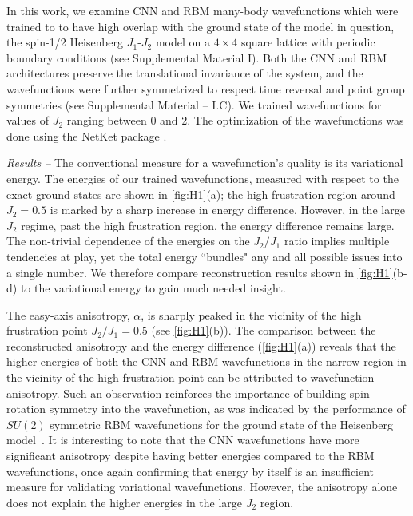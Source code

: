 \documentclass[amsmath,amssymb,aps,prl,superscriptaddress,twocolumn,floatfix]{revtex4}
\begin{document}
In this work, we examine CNN and RBM many-body wavefunctions which were trained to to have high overlap with the ground state of the model in question, the spin-1/2 Heisenberg $J_1$-$J_2$ model on a $4\times 4$ square lattice with periodic boundary conditions (see Supplemental Material I).
Both the CNN and RBM architectures preserve the translational invariance of the system, and the wavefunctions were further symmetrized to respect time reversal and point group symmetries (see Supplemental Material -- I.C).
We trained wavefunctions for values of $J_2$ ranging between 0 and 2. The optimization of the wavefunctions was done using the NetKet package \cite{netket}.
 
{\it Results --} The conventional measure for a wavefunction's quality is its variational energy.
The energies of our trained wavefunctions, measured with respect to the exact ground states are shown in \autoref{fig:H1}(a); the high frustration region around $J_2 = 0.5$ is marked by a sharp increase in energy difference.
However, in the large $J_2$ regime, past the high frustration region, the energy difference remains large.
The non-trivial dependence of the energies on the $J_2/J_1$ ratio implies multiple tendencies at play, yet the total energy ``bundles" any and all possible issues into a single number. We therefore compare reconstruction results shown in  \mbox{\autoref{fig:H1}(b-d)} to the variational energy to gain much needed insight. 

The easy-axis anisotropy, $\alpha$,
is sharply peaked in the vicinity of the high frustration point $J_2/J_1 = 0.5$ (see \autoref{fig:H1}(b)). The comparison between the reconstructed anisotropy and the energy difference (\autoref{fig:H1}(a)) reveals that the higher energies of both the CNN and RBM wavefunctions in the narrow region in the vicinity of the high frustration point can be attributed to wavefunction anisotropy.
Such an observation reinforces the importance of building spin rotation symmetry into the wavefunction, as was indicated by the performance of $SU(2)$ symmetric RBM wavefunctions for the
ground state of the Heisenberg model~\cite{PhysRevLett.124.097201}.
It is interesting to note that the CNN wavefunctions have more significant anisotropy despite having better energies compared to the RBM wavefunctions, once again confirming that energy by itself is an insufficient measure for validating variational wavefunctions.
However, the anisotropy alone does not explain the higher energies in the large $J_2$ region. 
\end{document}
